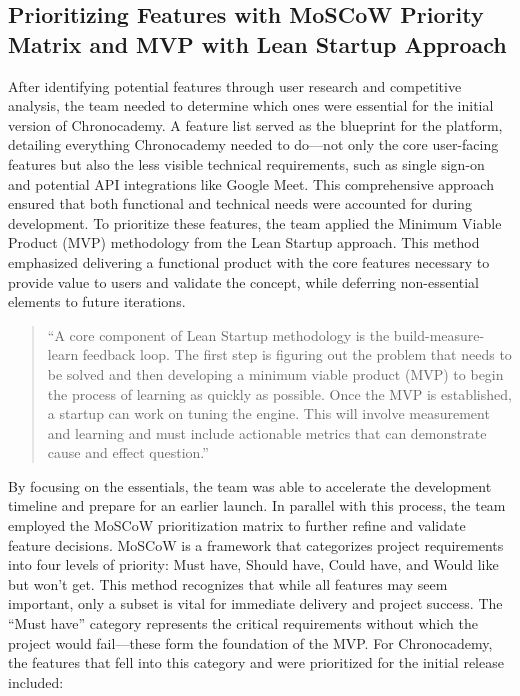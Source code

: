 \subsection{Prioritizing Features with MoSCoW Priority Matrix and MVP with Lean Startup Approach}\label{subsec:prioritizing-features-with-the-lean-startup-approach}
After identifying potential features through user research and competitive analysis, the team needed to determine which ones were essential for the initial version of Chronocademy.
A feature list served as the blueprint for the platform, detailing everything Chronocademy needed to do—not only the core user-facing features but also the less visible technical requirements, such as single sign-on and potential API integrations like Google Meet.
This comprehensive approach ensured that both functional and technical needs were accounted for during development.
To prioritize these features, the team applied the Minimum Viable Product (MVP) methodology from the Lean Startup approach.
This method emphasized delivering a functional product with the core features necessary to provide value to users and validate the concept, while deferring non-essential elements to future iterations.

\begin{quote}
    ``A core component of Lean Startup methodology is the build-measure-learn feedback loop.
    The first step is figuring out the problem that needs to be solved and then developing a minimum viable product (MVP) to begin the process of learning as quickly as possible.
    Once the MVP is established, a startup can work on tuning the engine.
    This will involve measurement and learning and must include actionable metrics that can demonstrate cause and effect question.''
\end{quote}\cite[Lean StartUp]{leanStartUp}

By focusing on the essentials, the team was able to accelerate the development timeline and prepare for an earlier launch.
In parallel with this process, the team employed the MoSCoW prioritization matrix to further refine and validate feature decisions.
MoSCoW is a framework that categorizes project requirements into four levels of priority: Must have, Should have, Could have, and Would like but won’t get.
This method recognizes that while all features may seem important, only a subset is vital for immediate delivery and project success.\cite[Moscow Matrix]{moscowMatrix}
The ``Must have'' category represents the critical requirements without which the project would fail—these form the foundation of the MVP. For Chronocademy, the features that fell into this category and were prioritized for the initial release included:

